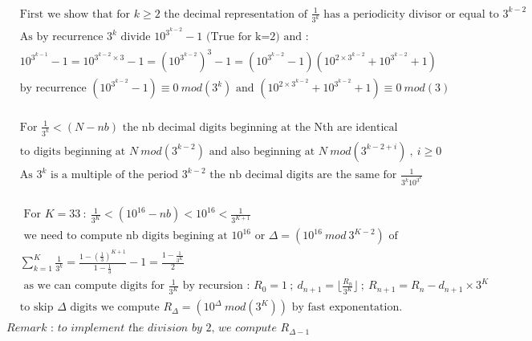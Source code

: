 \documentclass[10pt,a4paper]{letter}
\begin{document}
\begin{align*}
	&\text{First we show that for } k \geq 2 \text{ the decimal representation of }\frac{1}{3^{k}} \text{ has a periodicity divisor or equal to }3^{k-2}\\
	&\text{As by recurrence }3^{k}\text{ divide }10^{3^{k-2}}-1 \text{ (True for k=2) and :} \\
	&10^{3^{k-1}}-1=10^{3^{k-2}\times 3}-1=(10^{3^{k-2}})^{3}-1
	=(10^{3^{k-2}}-1)( 10^{2\times 3^{k-2}}+10^{3^{k-2}}+1)\\
	&\text{by recurrence }(10^{3^{k-2}}-1) \equiv 0 \ mod(3^{k})\text{ and }( 10^{2\times 3^{k-2}}+10^{3^{k-2}}+1) \equiv0  \ mod(3) 
	\\
\end{align*}

\begin{align*}
	&\text{For }\frac{1}{3^{k}}< (N-nb) \text{ the nb decimal digits beginning at the Nth  are identical }\\
	&\text{to digits beginning at }N\ mod(3^{k-2})\text{ and also beginning at }N\ mod(3^{k-2+i})\ ,\ i\geq 0\\
	&\text{As }3^{k}\text{ is a multiple of the period }3^{k-2}\text{ the nb decimal digits are the same for }\frac{1}{3^{k}10^{3^{k}}} \\
\end{align*}

\begin{align*}
	&\text{ For }K=33\ :\ \frac{1}{3^{K}}< (10^{16}-nb) <10^{16}<\frac{1}{3^{K+1}}\\
	&\text{ we need to compute nb digits begining at }10^{16}\text{ or }\Delta=(10^{16}\ mod \ 3^{K-2})\text{ of }\\ 
	&\sum_{k=1}^{K}\frac{1}{3^{k}}=\frac{1-(\frac{1}{3})^{K+1}}{1-\frac{1}{3}}-1
	=\frac{1-\frac{1}{3^{K}}}{2}  \\
	&\text{ as we can compute digits for }\frac{1}{3^{K}}\text{ by recursion : } R_{0}=1\ ;\ d_{n+1}=\lfloor\frac{R_{n}}{3^{K}}\rfloor\ ; \ R_{n+1}=R_{n}-d_{n+1}\times 3^{K}\\
	&\text{to skip }\Delta\text{ digits we compute }R_{\Delta}=(10^{\Delta}\ mod(3^{K})) \text{ by fast exponentation}.\\ 
\end{align*}
$	\textit{Remark : to implement the division by 2, we compute } R_{\Delta -1} $
\end{document}
